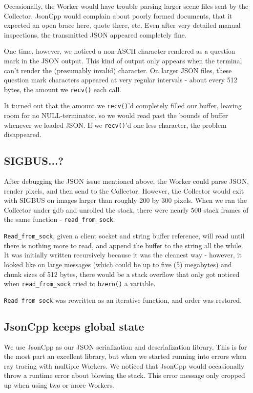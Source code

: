 \documentclass[letterpaper,twocolumn,10pt]{article}
\begin{document}
Occasionally, the Worker would have trouble parsing larger scene files sent by
the Collector. JsonCpp would complain about poorly formed documents, that it
expected an open brace here, quote there, etc. Even after very detailed manual
inspections, the transmitted JSON appeared completely fine.

One time, however, we noticed a non-ASCII character rendered as a question mark
in the JSON output. This kind of output only appears when the terminal can't
render the (presumably invalid) character. On larger JSON files, these question
mark characters appeared at very regular intervals - about every 512 bytes, the
amount we \verb|recv()| each call.

It turned out that the amount we \verb|recv()|'d completely filled our buffer,
leaving room for no NULL-terminator, so we would read past the bounds of buffer
whenever we loaded JSON. If we \verb|recv()|'d one less character, the problem
disappeared.

\subsection{SIGBUS...?}

After debugging the JSON issue mentioned above, the Worker could parse JSON,
render pixels, and then send to the Collector. However, the Collector would exit
with SIGBUS on images larger than roughly 200 by 300 pixels. When we ran the
Collector under gdb and unrolled the stack, there were nearly 500 stack frames
of the same function - \verb|read_from_sock|.

\verb|Read_from_sock|, given a client socket and string buffer reference, will
read until there is nothing more to read, and append the buffer to the string
all the while. It was initially written recursively because it was the cleanest
way - however, it looked like on large messages (which could be up to five (5)
megabytes) and chunk sizes of 512 bytes, there would be a stack overflow that
only got noticed when \verb|read_from_sock| tried to \verb|bzero()| a variable.

\verb|Read_from_sock| was rewritten as an iterative function, and order was
restored.

\subsection{JsonCpp keeps global state}

We use JsonCpp as our JSON serialization and deserialization library. This is
for the most part an excellent library, but when we started running into errors
when ray tracing with multiple Workers. We noticed that JsonCpp would
occasionally throw a runtime error about blowing the stack. This error message
only cropped up when using two or more Workers.
\end{document}
